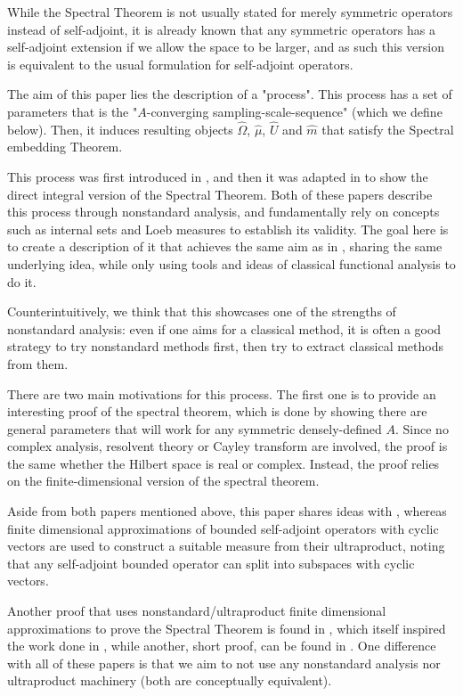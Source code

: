 \documentclass{amsart}
\theoremstyle{definition}
\theoremstyle{remark}
\def \HOM{\hat{\Omega}}
\def \HMU{\hat{\mu}}
\def \HU{\hat{U}}
\def \Hm{\hat{m}}
\begin{document}
While the Spectral Theorem is not usually stated for merely symmetric operators instead of self-adjoint, it is already known that any symmetric operators has a self-adjoint extension if we allow the space to be larger, and as such this version is equivalent to the usual formulation for self-adjoint operators.


The aim of this paper lies the description of a "process". This process has a set of parameters that is the "$A$-converging sampling-scale-sequence" (which we define below). Then, it induces resulting objects $\HOM$, $\HMU$, $\HU$ and $\Hm$ that satisfy the Spectral embedding Theorem.

 This process was first introduced in \cite{nonez2024spectralequivalencesnonstandardsamplings}, and then it was adapted in \cite{goldbring2025nonstandardapproachdirectintegral} to show the direct integral version of the Spectral Theorem. Both of these papers describe this process through nonstandard analysis, and fundamentally rely on concepts such as internal sets and Loeb measures to establish its validity. The goal here is to create a description of it that achieves the same aim as in \cite{nonez2024spectralequivalencesnonstandardsamplings}, sharing the same underlying idea, while only using tools and ideas of classical functional analysis to do it. 
 
 Counterintuitively, we think that this showcases one of the strengths of nonstandard analysis: even if one aims for a classical method, it is often a good strategy to try nonstandard methods first, then try to extract classical methods from them.

There are two main motivations for this process. The first one is to provide an interesting proof of the spectral theorem, which is done by showing there are general parameters that will work for any symmetric densely-defined $A$. Since no complex analysis, resolvent theory or Cayley transform are involved, the proof is the same whether the Hilbert space is real or complex. Instead, the proof relies on the finite-dimensional version of the spectral theorem.

Aside from both papers mentioned above, this paper shares ideas with \cite{HIRVONEN_HYTTINEN_2024}, whereas finite dimensional approximations of bounded self-adjoint operators with cyclic vectors are used to construct a suitable measure from their ultraproduct, noting that any self-adjoint bounded operator can split into subspaces with cyclic vectors.

Another proof that uses nonstandard/ultraproduct finite dimensional approximations to prove the Spectral Theorem is found in \cite{GOLDBRING2021590}, which itself inspired the work done in \cite{nonez2024spectralequivalencesnonstandardsamplings}, while another, short proof, can be found in \cite{matsunaga2024shortnonstandardproofspectral}. One difference with all of these papers is that we aim to not use any nonstandard analysis nor ultraproduct machinery (both are conceptually equivalent).
\end{document}
